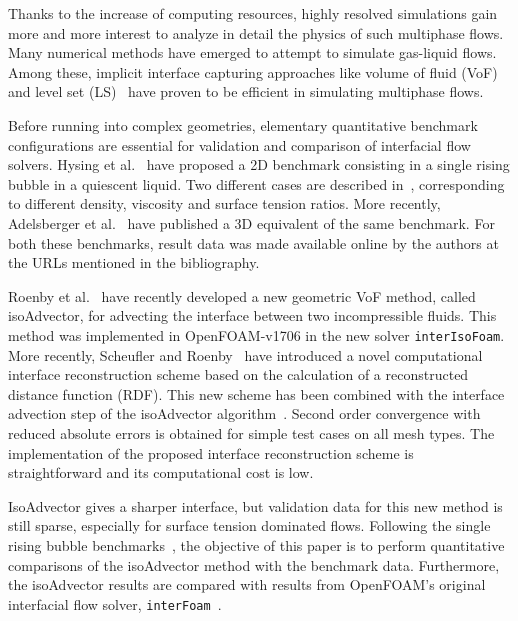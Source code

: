 \documentclass[review]{elsarticle}
\begin{document}
Thanks to the increase of computing resources, highly resolved simulations gain more and more 
interest to analyze in detail the physics of such multiphase flows. Many numerical methods 
have emerged to attempt to simulate gas-liquid flows. Among these, implicit interface capturing 
approaches like volume of fluid (VoF)~\cite{HIRT1981201} and level set (LS)~\cite{OSHER198812} 
have proven to be efficient in simulating multiphase flows. 

Before running into complex geometries, elementary quantitative benchmark configurations are 
essential for validation and comparison of interfacial flow solvers. Hysing et 
al.~\cite{Hysing2009} have proposed a 2D benchmark consisting in a single rising bubble in 
a quiescent liquid. Two different cases are described in~\cite{Hysing2009}, corresponding to 
different density, viscosity and surface tension ratios. More recently, Adelsberger et al.~\cite{Adelsberger2014} have published a 3D equivalent of the same benchmark. For both these benchmarks, result data was made available online by the authors at the URLs mentioned in the bibliography. 

Roenby et al.~\cite{Roenby160405} have recently developed a new geometric VoF method, called isoAdvector, for advecting the interface between two incompressible fluids. This method was implemented in OpenFOAM-v1706 in the new solver \verb+interIsoFoam+. 
More recently, Scheufler and Roenby~\cite{Scheufler2018} have introduced a novel computational interface reconstruction scheme based on the calculation of a reconstructed distance function (RDF). This new scheme has been combined with the interface advection step of the isoAdvector algorithm~\cite{Scheufler2018}. Second order convergence with reduced absolute errors is obtained for simple test cases on all mesh types. The implementation of the proposed interface reconstruction scheme is straightforward and its computational cost is low. 

IsoAdvector gives a sharper interface, but validation data for this new method is still sparse, especially for surface tension dominated flows. Following the single rising bubble benchmarks~\cite{Hysing2009,Adelsberger2014}, the objective of this paper is to perform quantitative comparisons of the isoAdvector method with the benchmark data. Furthermore, the isoAdvector results are compared with results from OpenFOAM's original interfacial flow solver, \verb+interFoam+~\cite{Weller2008}.

\end{document}

